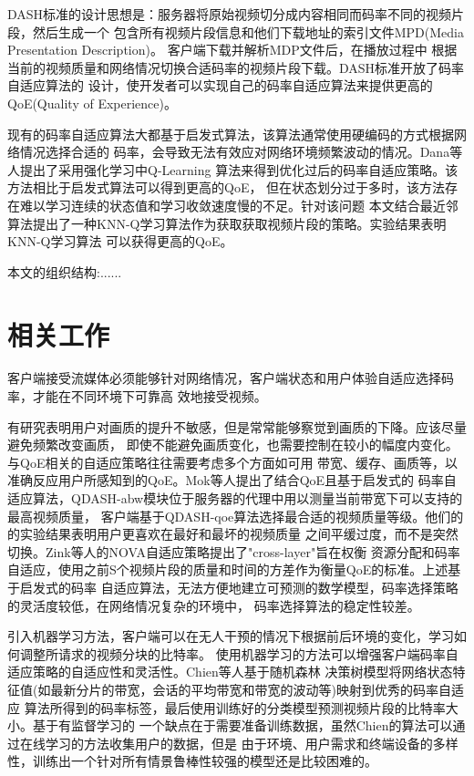\documentclass[twocolumn]{article}
\begin{document}
DASH标准的设计思想是：服务器将原始视频切分成内容相同而码率不同的视频片段，然后生成一个
包含所有视频片段信息和他们下载地址的索引文件MPD(Media Presentation Description)。
客户端下载并解析MDP文件后，在播放过程中
根据当前的视频质量和网络情况切换合适码率的视频片段下载\cite{RN3}。DASH标准开放了码率自适应算法的
设计，使开发者可以实现自己的码率自适应算法来提供更高的QoE(Quality of Experience)。

现有的码率自适应算法大都基于启发式算法，该算法通常使用硬编码的方式根据网络情况选择合适的
码率，会导致无法有效应对网络环境频繁波动的情况\cite{RN4}。Dana等人提出了采用强化学习中Q-Learning
算法来得到优化过后的码率自适应策略\cite{RN5}。该方法相比于启发式算法可以得到更高的QoE，
但在状态划分过于多时，该方法存在难以学习连续的状态值和学习收敛速度慢的不足。针对该问题
本文结合最近邻算法提出了一种KNN-Q学习算法作为获取获取视频片段的策略。实验结果表明KNN-Q学习算法
可以获得更高的QoE。

本文的组织结构:......

\section{相关工作}

客户端接受流媒体必须能够针对网络情况，客户端状态和用户体验自适应选择码率，才能在不同环境下可靠高
效地接受视频。

有研究\cite{RN7}表明用户对画质的提升不敏感，但是常常能够察觉到画质的下降。应该尽量避免频繁改变画质，
即使不能避免画质变化，也需要控制在较小的幅度内变化。与QoE相关的自适应策略往往需要考虑多个方面如可用
带宽、缓存、画质等，以准确反应用户所感知到的QoE。Mok\cite{RN6}等人提出了结合QoE且基于启发式的
码率自适应算法，QDASH-abw模块位于服务器的代理中用以测量当前带宽下可以支持的最高视频质量，
客户端基于QDASH-qoe算法选择最合适的视频质量等级。他们的的实验结果表明用户更喜欢在最好和最坏的视频质量
之间平缓过度，而不是突然切换。Zink\cite{RN7}等人的NOVA自适应策略提出了"cross-layer"旨在权衡
资源分配和码率自适应，使用之前S个视频片段的质量和时间的方差作为衡量QoE的标准。上述基于启发式的码率
自适应算法，无法方便地建立可预测的数学模型，码率选择策略的灵活度较低，在网络情况复杂的环境中，
码率选择算法的稳定性较差。

引入机器学习方法，客户端可以在无人干预的情况下根据前后环境的变化，学习如何调整所请求的视频分块的比特率。
使用机器学习的方法可以增强客户端码率自适应策略的自适应性和灵活性。Chien\cite{RN9}等人基于随机森林
决策树模型将网络状态特征值(如最新分片的带宽，会话的平均带宽和带宽的波动等)映射到优秀的码率自适应
算法所得到的码率标签，最后使用训练好的分类模型预测视频片段的比特率大小。基于有监督学习的
一个缺点在于需要准备训练数据，虽然Chien的算法可以通过在线学习的方法收集用户的数据，但是
由于环境、用户需求和终端设备的多样性，训练出一个针对所有情景鲁棒性较强的模型还是比较困难的。
\end{document}
